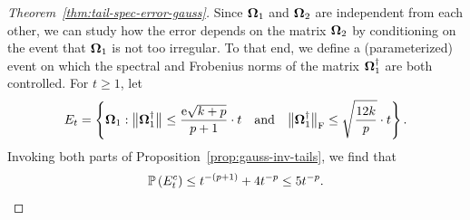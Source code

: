 \documentclass[final]{siamltex}
\begin{document}
\begin{proof}[Theorem~\ref{thm:tail-spec-error-gauss}]
Since $\mtx{\Omega}_1$ and $\mtx{\Omega}_2$ are independent from each other,
we can study how the error depends on the matrix $\mtx{\Omega}_2$ by conditioning
on the event that $\mtx{\Omega}_1$ is not too irregular.
To that end, we define a (parameterized) event on which the spectral and Frobenius
norms of the matrix $\mtx{\Omega}_1^\psinv$ are both controlled.  For $t \geq 1$, let
$$
E_t = \left\{ \mtx{\Omega}_1 :
    \smnorm{}{ \mtx{\Omega}_1^\psinv } \leq \frac{\econst\sqrt{k+p}}{p+1} \cdot t
    \quad\text{and}\quad
    \smnorm{\rm F}{ \mtx{\Omega}_1^\psinv } \leq \sqrt{\frac{12k}{p}} \cdot t \right\}.
$$
Invoking both parts of Proposition~\ref{prop:gauss-inv-tails}, we find that
$$
\Probe{E_t^c} \leq t^{-(p+1)} + 4 t^{-p} \leq 5 t^{-p}.
$$


\end{proof}
\end{document}
